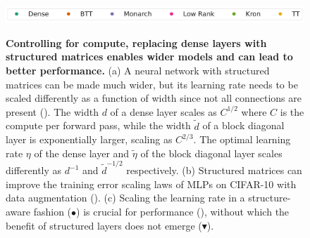 \documentclass{article}
\theoremstyle{plain}
\theoremstyle{definition}
\theoremstyle{remark}
\begin{document}
%

\begin{figure}[!t]
\centering
    \hspace{55mm}
    \includegraphics[width=0.8\linewidth]{figs/mlp_cifar10_legend.pdf} 
    \\
   \caption{
     \textbf{Controlling for compute, replacing dense layers with structured matrices enables wider models and can lead to better performance.} (a) A neural network with structured matrices can be made much wider, but its learning rate needs to be scaled differently as a function of width since not all connections are present (). The width $d$ of a dense layer scales as $C^{1/2}$ where $C$ is the compute per forward pass, while the width $\tilde{d}$ of a block diagonal layer is exponentially larger, scaling as $C^{2/3}.$ The optimal learning rate $\eta$ of the dense layer and $\tilde{\eta}$ of the block diagonal layer scales differently as $d^{-1}$ and $\tilde{d}^{-1/2}$ respectively. (b) Structured matrices can improve the training error scaling laws of MLPs on CIFAR-10 with data augmentation (). (c) Scaling the learning rate in a structure-aware fashion ($\bullet$) is crucial for performance (), without which the benefit of structured layers does not emerge ($\blacktriangledown$).
     }
    \vspace{-4mm}
\end{figure}
\end{document}
